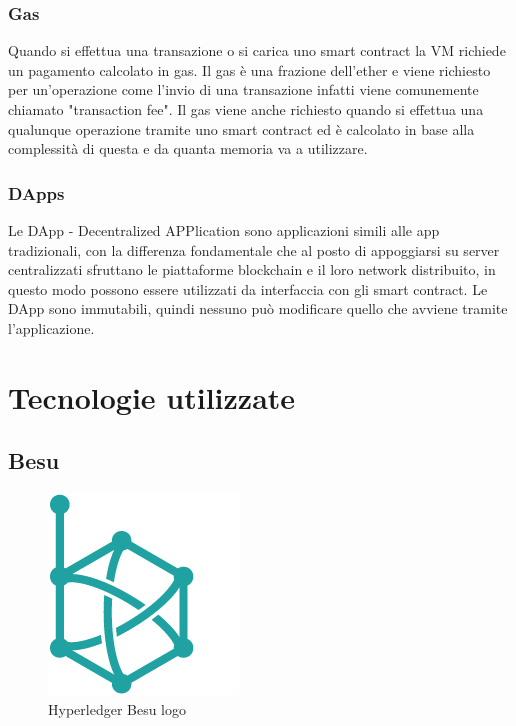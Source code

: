 \documentclass[12pt,titlepage]{report}
\begin{document}
\subsection{Gas}

Quando si effettua una transazione o si carica uno smart contract la VM richiede un pagamento calcolato in gas. Il gas è una frazione dell'ether e viene richiesto per un'operazione come l'invio di una transazione infatti viene comunemente chiamato "transaction fee". Il gas viene anche richiesto quando si effettua una qualunque operazione tramite uno smart contract ed è calcolato in base alla complessità di questa e da quanta memoria va a utilizzare. 

\subsection{DApps}

Le DApp - Decentralized APPlication sono applicazioni simili alle app tradizionali, con la differenza fondamentale che al posto di appoggiarsi su server centralizzati sfruttano le piattaforme blockchain e il loro network distribuito, in questo modo possono essere utilizzati da interfaccia con gli smart contract. Le DApp sono immutabili, quindi nessuno può modificare quello che avviene tramite l’applicazione.

\chapter{Tecnologie utilizzate}

\section{Besu}
\begin{figure}
	\includegraphics[height=0.2\textheight]{Hyperledger_Besu}
	\centering
	\caption{Hyperledger Besu logo}
	\label{fig:Hyperledger_Besu_logo}
\end{figure}
\end{document}
